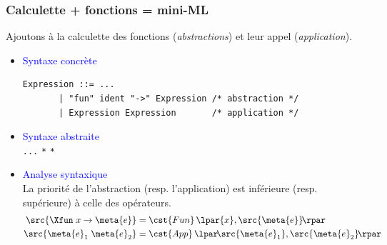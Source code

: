 %
\begin{frame}[containsverbatim]
\frametitle{Calculette + fonctions = mini-ML}

Ajoutons à la calculette des fonctions (\emph{abstractions}) et leur
appel (\emph{application}).
\begin{itemize}

  \item \textcolor{blue}{Syntaxe concrète}
    {\small
     \begin{verbatim}
Expression ::= ...
       | "fun" ident "->" Expression /* abstraction */
       | Expression Expression       /* application */
     \end{verbatim}
    }

  \vspace*{-12pt}

  \item \textcolor{blue}{Syntaxe abstraite}\\
  \Xtype {} \equal \texttt{...} \vbar {}
  \Xof {} \texttt{*}  \vbar {}
  \Xof {} \texttt{*} \semi{}

  \medskip

  \item \textcolor{blue}{Analyse syntaxique}\\
  La priorité de l'abstraction (resp. l'application) est inférieure
  (resp. supérieure) à celle des opérateurs.
  \begin{align*}
    \src{\Xfun \; x \rightarrow \meta{e}} &= \cst{Fun} \,
    \lpar{x}, \src{\meta{e}}\!\rpar\\
    \src{\meta{e}_1 \; \meta{e}_2} &= \cst{App} \,
    \lpar\!\src{\meta{e}_1}, \src{\meta{e}_2}\!\rpar
  \end{align*}

\end{itemize}

\end{frame}


